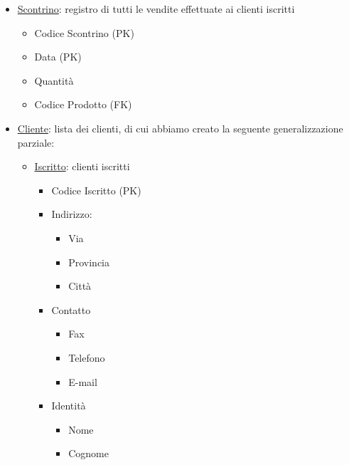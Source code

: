 \begin{itemize}
\item \underline{Scontrino}: registro di tutti le vendite effettuate ai clienti iscritti
  \begin{itemize}
  \item Codice Scontrino (PK)
  \item Data (PK)
  \item Quantit\`a
  \item Codice Prodotto (FK)
  \end{itemize}

\item \underline{Cliente}: lista dei clienti, di cui abbiamo creato la seguente generalizzazione parziale:
  \begin{itemize}
  \item \underline{Iscritto}: clienti iscritti
    \begin{itemize}
    \item Codice Iscritto (PK)
    \item Indirizzo:
      \begin{itemize}
      \item Via
      \item Provincia
      \item Citt\`a
      \end{itemize}

    \item Contatto
      \begin{itemize}
      \item Fax
      \item Telefono
      \item E-mail
      \end{itemize}

    \item Identit\`a
      \begin{itemize}
      \item Nome
      \item Cognome
      \end{itemize}

    \end{itemize}
  \end{itemize}
  
\end{itemize}



